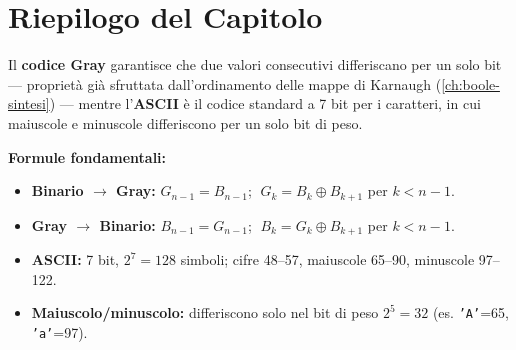 \section*{Riepilogo del Capitolo}

\begin{important}
Il \textbf{codice Gray} garantisce che due valori consecutivi differiscano per un solo bit — proprietà già sfruttata dall'ordinamento delle mappe di Karnaugh (\cref{ch:boole-sintesi}) — mentre l'\textbf{ASCII} è il codice standard a 7 bit per i caratteri, in cui maiuscole e minuscole differiscono per un solo bit di peso.
\end{important}

\begin{note}
\textbf{Formule fondamentali:}
\begin{itemize}
    \item \textbf{Binario $\to$ Gray:} $G_{n-1}=B_{n-1}$; $\; G_k = B_k \oplus B_{k+1}$ per $k<n-1$.
    \item \textbf{Gray $\to$ Binario:} $B_{n-1}=G_{n-1}$; $\; B_k = G_k \oplus B_{k+1}$ per $k<n-1$.
    \item \textbf{ASCII:} 7 bit, $2^7=128$ simboli; cifre 48--57, maiuscole 65--90, minuscole 97--122.
    \item \textbf{Maiuscolo/minuscolo:} differiscono solo nel bit di peso $2^5=32$ (es. \texttt{'A'}=65, \texttt{'a'}=97).
\end{itemize}
\end{note}

